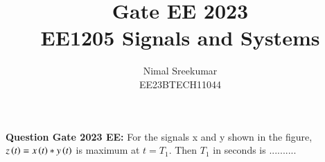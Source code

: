 \documentclass[a4,12pt,twocolumn]{IEEEtran}
\begin{document}
\let\vec\mathbf

\title{
\Huge\textbf{Gate EE 2023}\\
\Huge\textbf{EE1205} Signals and Systems\\
}
\large\author{Nimal Sreekumar\\EE23BTECH11044}

\maketitle



\bigskip

\renewcommand{\thefigure}{\arabic{figure}}
\renewcommand{\thetable}{\theenumi}


\textbf{Question Gate 2023 EE:}
For the signals x and y shown in the figure, $z\left(t\right)=x\left(t\right)*y\left(t\right)$ is maximum at $t=T_1$. Then $T_1$ in seconds is .......... \\



\end{document}
